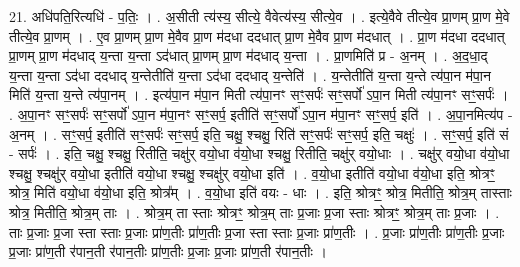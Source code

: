 \documentclass[17pt]{extarticle}
\begin{document}
21. अधि॑पति॒रित्यधि॑ - प॒तिः॒ । . अ॒सीती त्य॑स्य॒ सीत्ये॒ वैवेत्य॑स्य॒ सीत्ये॒व । . इत्ये॒वैवे तीत्ये॒व प्रा॒णम् प्रा॒ण मे॒वे तीत्ये॒व प्रा॒णम् । . ए॒व प्रा॒णम् प्रा॒ण मे॒वैव प्रा॒ण म॑दधा ददधात् प्रा॒ण मे॒वैव प्रा॒ण म॑दधात् । . प्रा॒ण म॑दधा ददधात् प्रा॒णम् प्रा॒ण म॑दधाद् य॒न्ता य॒न्ता ऽद॑धात् प्रा॒णम् प्रा॒ण म॑दधाद् य॒न्ता । . प्रा॒णमिति॑ प्र - अ॒नम् । . अ॒द॒धा॒द् य॒न्ता य॒न्ता ऽद॑धा ददधाद् य॒न्तेतीति॑ य॒न्ता ऽद॑धा ददधाद् य॒न्तेति॑ । . य॒न्तेतीति॑ य॒न्ता य॒न्ते त्य॑पा॒न म॑पा॒न मिति॑ य॒न्ता य॒न्ते त्य॑पा॒नम् । . इत्य॑पा॒न म॑पा॒न मिती त्य॑पा॒नꣳ सꣳ॒॒सर्पः॑ सꣳ॒॒सर्पो॑ ऽपा॒न मिती त्य॑पा॒नꣳ सꣳ॒॒सर्पः॑ । . अ॒पा॒नꣳ सꣳ॒॒सर्पः॑ सꣳ॒॒सर्पो॑ ऽपा॒न म॑पा॒नꣳ सꣳ॒॒सर्प॒ इतीति॑ सꣳ॒॒सर्पो॑ ऽपा॒न म॑पा॒नꣳ सꣳ॒॒सर्प॒ इति॑ । . अ॒पा॒नमित्य॑प - अ॒नम् । . सꣳ॒॒सर्प॒ इतीति॑ सꣳ॒॒सर्पः॑ सꣳ॒॒सर्प॒ इति॒ चक्षु॒ श्चक्षु॒ रिति॑ सꣳ॒॒सर्पः॑ सꣳ॒॒सर्प॒ इति॒ चक्षुः॑ । . सꣳ॒॒सर्प॒ इति॑ सं - सर्पः॑ । . इति॒ चक्षु॒ श्चक्षु॒ रितीति॒ चक्षु॑र् वयो॒धा व॑यो॒धा श्चक्षु॒ रितीति॒ चक्षु॑र् वयो॒धाः । . चक्षु॑र् वयो॒धा व॑यो॒धा श्चक्षु॒ श्चक्षु॑र् वयो॒धा इतीति॑ वयो॒धा श्चक्षु॒ श्चक्षु॑र् वयो॒धा इति॑ । . व॒यो॒धा इतीति॑ वयो॒धा व॑यो॒धा इति॒ श्रोत्रꣳ॒॒ श्रोत्र॒ मिति॑ वयो॒धा व॑यो॒धा इति॒ श्रोत्र᳚म् । . व॒यो॒धा इति॑ वयः - धाः । . इति॒ श्रोत्रꣳ॒॒ श्रोत्र॒ मितीति॒ श्रोत्र॒म् तास्ताः श्रोत्र॒ मितीति॒ श्रोत्र॒म् ताः । . श्रोत्र॒म् ता स्ताः श्रोत्रꣳ॒॒ श्रोत्र॒म् ताः प्र॒जाः प्र॒जा स्ताः श्रोत्रꣳ॒॒ श्रोत्र॒म् ताः प्र॒जाः । . ताः प्र॒जाः प्र॒जा स्ता स्ताः प्र॒जाः प्रा॑ण॒तीः प्रा॑ण॒तीः प्र॒जा स्ता स्ताः प्र॒जाः प्रा॑ण॒तीः । . प्र॒जाः प्रा॑ण॒तीः प्रा॑ण॒तीः प्र॒जाः प्र॒जाः प्रा॑ण॒ती र॑पान॒ती र॑पान॒तीः प्रा॑ण॒तीः प्र॒जाः प्र॒जाः प्रा॑ण॒ती र॑पान॒तीः । \newline
\end{document}
